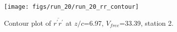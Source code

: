 \begin{figure}[H]
\centering
\texttt{[image: figs/run\_20/run\_20\_rr\_contour]}
\caption{Contour plot of $\overline{r^\prime r^\prime}$ at $z/c$=6.97, $V_{free}$=33.39, station 2.}
\label{fig:run_20_rr_contour}
\end{figure}


